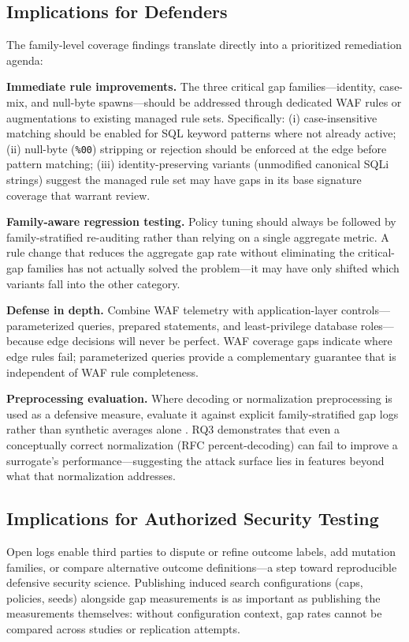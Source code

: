 \subsection{Implications for Defenders}
The family-level coverage findings translate directly into a prioritized remediation agenda:

\textbf{Immediate rule improvements.} The three critical gap families---identity, case-mix, and null-byte spawns---should be addressed through dedicated WAF rules or augmentations to existing managed rule sets. Specifically: (i) case-insensitive matching should be enabled for SQL keyword patterns where not already active; (ii) null-byte (\texttt{\%00}) stripping or rejection should be enforced at the edge before pattern matching; (iii) identity-preserving variants (unmodified canonical SQLi strings) suggest the managed rule set may have gaps in its base signature coverage that warrant review.

\textbf{Family-aware regression testing.} Policy tuning should always be followed by family-stratified re-auditing rather than relying on a single aggregate metric. A rule change that reduces the aggregate gap rate without eliminating the critical-gap families has not actually solved the problem---it may have only shifted which variants fall into the \textsf{other} category.

\textbf{Defense in depth.} Combine WAF telemetry with application-layer controls---parameterized queries, prepared statements, and least-privilege database roles---because edge decisions will never be perfect. WAF coverage gaps indicate where edge rules fail; parameterized queries provide a complementary guarantee that is independent of WAF rule completeness.

\textbf{Preprocessing evaluation.} Where decoding or normalization preprocessing is used as a defensive measure, evaluate it against explicit family-stratified gap logs rather than synthetic averages alone \cite{zhang2026bwafsql}. RQ3 demonstrates that even a conceptually correct normalization (RFC percent-decoding) can fail to improve a surrogate's performance---suggesting the attack surface lies in features beyond what that normalization addresses.

\subsection{Implications for Authorized Security Testing}
Open logs enable third parties to dispute or refine outcome labels, add mutation families, or compare alternative outcome definitions---a step toward reproducible defensive security science. Publishing induced search configurations (caps, policies, seeds) alongside gap measurements is as important as publishing the measurements themselves: without configuration context, gap rates cannot be compared across studies or replication attempts.

